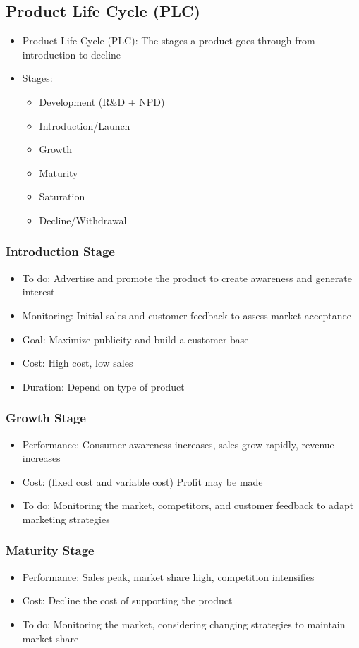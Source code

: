 \documentclass[openany,12pt,a4paper]{book}
\begin{document}
\subsection{Product Life Cycle (PLC)}
\begin{itemize}
    \item Product Life Cycle (PLC): The stages a product goes through from introduction to decline
    \item Stages:
    \begin{itemize}
        \item Development (R\&D + NPD)
        \item Introduction/Launch
        \item Growth
        \item Maturity
        \item Saturation
        \item Decline/Withdrawal
    \end{itemize}
\end{itemize}
\subsubsection{Introduction Stage}
\begin{itemize}
    \item To do: Advertise and promote the product to create awareness and generate interest
    \item Monitoring: Initial sales and customer feedback to assess market acceptance
    \item Goal: Maximize publicity and build a customer base
    \item Cost: High cost, low sales
    \item Duration: Depend on type of product
\end{itemize}
\subsubsection{Growth Stage}
\begin{itemize}
    \item Performance: Consumer awareness increases, sales grow rapidly, revenue increases
    \item Cost: (fixed cost and variable cost) Profit may be made
    \item To do: Monitoring the market, competitors, and customer feedback to adapt marketing strategies
\end{itemize}
\subsubsection{Maturity Stage}
\begin{itemize}
    \item Performance: Sales peak, market share high, competition intensifies
    \item Cost: Decline the cost of supporting the product
    \item To do: Monitoring the market, considering changing strategies to maintain market share
\end{itemize}
\end{document}
